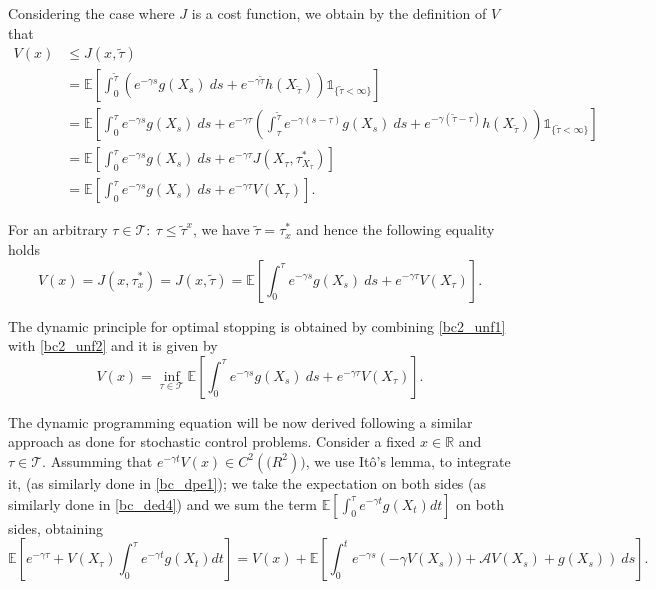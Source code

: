 Considering the case where $J$ is a cost function, we obtain by the definition of $V$ that
\begin{align}
V(x)&\leq J(x,\tilde{\tau}) \nonumber  \\
&= \mathds{E}\left[ \int^{\tilde{\tau}}_0 \left(e^{-\gamma s} g(X_s) \ ds +e^{-\gamma \tilde{\tau}}h(X_{\tilde{\tau}}) 
\right) \mathds{1}_{ \{\tilde{\tau}< \infty \}} \right] \nonumber \\
&= \mathds{E} \left[ \int^\tau_0 e^{-\gamma s} g(X_s) \ ds +e^{-\gamma \tau} \left( \int^{\tilde{\tau}}_\tau e^{-\gamma (s-\tau)} g(X_s) \ ds + e^{-\gamma (\tilde{\tau}-\tau)} h(X_{\tilde{\tau}} )  \right) 
\mathds{1}_{ \{\tilde{\tau}< \infty \}} 
\right] \nonumber \\
&=  \mathds{E}\left[ \int^{\tau}_0 e^{-\gamma s} g(X_s) \ ds +e^{-\gamma \tau} J(X_\tau,\tau^*_{X_\tau}) \right] \nonumber \\
&= \mathds{E}\left[ \int^{\tau}_0 e^{-\gamma s} g(X_s) \ ds +e^{-\gamma \tau}V(X_\tau) \right].
 \label{bc2_unf1}
\end{align}

For an arbitrary $\tau\in \mathcal{T}: \ \tau \leq \tilde{\tau}^x$, we have $\tilde{\tau}=\tau_x^*$ and hence the following equality holds
\begin{equation}
V(x)=J(x,\tau_x^*)=J(x,\tilde{\tau})=\mathds{E}\left[ \int^{\tau}_0 e^{-\gamma s} g(X_s) \ ds +e^{-\gamma \tau}V(X_\tau) \right].
	\label{bc2_unf2}
\end{equation}

The dynamic principle for optimal stopping is obtained by combining \eqref{bc2_unf1} with \eqref{bc2_unf2} and it is given by
\begin{equation}
V(x)=\inf_{\tau \in \mathcal{T}} \mathds{E}\left[ \int^{\tau}_0 e^{-\gamma s} g(X_s) \ ds +e^{-\gamma \tau}V(X_\tau) \right].
	\label{bc2_dpp}
\end{equation}

The dynamic programming equation will be now derived following a similar approach as done for stochastic control problems. Consider a fixed $x \in \mathds{R}$ and $\tau \in \mathcal{T}$. Assumming that $e^{-\gamma t} V(x) \in C^2(\mathds(R^2))$, we use Itô's lemma, to integrate it, (as similarly done in \eqref{bc_dpe1}); we take the expectation on both sides (as similarly done in \eqref{bc_ded4}) and we sum the term $\mathds{E}\left[ \int^\tau_0 e^{-\gamma t}g(X_t)dt \right]$ on both sides, obtaining 
\begin{equation}
\mathds{E} \left[e^{-\gamma \tau} + V(X_\tau) \int^\tau_0 e^{-\gamma t}g(X_t)dt \right]=
V(x)+\mathds{E} \left[ \int^t_0  e^{-\gamma s} \left( - \gamma V(X_s))+\mathcal{A}V(X_s)+g(X_s) \right) \ ds \right].
\label{bc2_unf3}
\end{equation}

